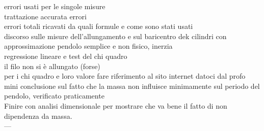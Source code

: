 errori usati per le singole misure\\
trattazione accurata errori\\
errori totali ricavati da quali formule e come sono stati usati\\
discorso sulle misure dell'allungamento e sul baricentro dek cilindri con approssimazione pendolo semplice e non fisico, inerzia\\
regressione lineare e test del chi quadro\\
il filo non si è allungato (forse)\\
per i chi quadro e loro valore fare riferimento al sito internet datoci dal profo\\
mini conclusione sul fatto che la massa non influisce minimamente sul periodo del pendolo, verificato praticamente\\
Finire con analisi dimensionale per mostrare che va bene il fatto di non dipendenza da massa.\\---
